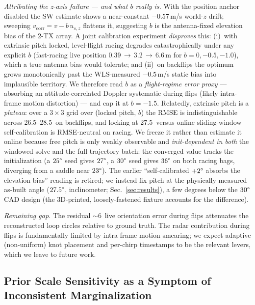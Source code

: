 \documentclass[conference]{IEEEtran}
\begin{document}
\emph{Attributing the z-axis failure --- and what $b$ really is.}
With the position anchor disabled the SW estimate shows a near-constant
$-0.57$\,m/s world-$z$ drift; sweeping
$v_{\mathrm{corr}} = v - b\,u_{s,z}$ flattens it, suggesting $b$ is the
antenna-fixed elevation bias of the 2-TX array.  A joint calibration
experiment \emph{disproves} this: (i)~with extrinsic pitch locked,
level-flight racing degrades catastrophically under any explicit $b$
(fast-racing live position 0.39\,$\to$\,3.2\,$\to$\,6.6\,m for
$b{=}0,-0.5,-1.0$), which a true antenna bias would tolerate; and
(ii)~on backflips the optimum grows monotonically past the WLS-measured
$-0.5$\,m/s static bias into implausible territory.  We therefore read
$b$ as a \emph{flight-regime error proxy} --- absorbing an
attitude-correlated Doppler systematic during flips (likely intra-frame
motion distortion) --- and cap it at $b{=}{-}1.5$.
Relatedly, extrinsic pitch is a \emph{plateau}: over a $3{\times}3$ grid
over (locked pitch, $b$) the RMSE is indistinguishable across
26.5--28.5\degree\ on backflips, and locking at 27.5\degree\ versus
online sliding-window self-calibration is RMSE-neutral on racing.  We
freeze it rather than estimate it online because free pitch is only
weakly observable and \emph{init-dependent in both} the windowed solve
and the full-trajectory batch: the converged value tracks the
initialization (a $25\degree$ seed gives $27\degree$, a $30\degree$ seed
gives $36\degree$ on both racing bags, diverging from a saddle near
$23\degree$).  The earlier ``self-calibrated $+2\degree$ absorbs the
elevation bias'' reading is retired; we instead fix pitch at the
physically measured as-built angle ($27.5\degree$, inclinometer;
Sec.~\ref{sec:results}), a few degrees below the $30\degree$ CAD design
(the 3D-printed, loosely-fastened fixture accounts for the difference).

\emph{Remaining gap.}
The residual $\sim$6\degree\ live orientation error during flips
attenuates the reconstructed loop circles relative to ground truth.
The radar contribution during flips is fundamentally limited by
intra-frame motion smearing; we expect adaptive (non-uniform) knot
placement and per-chirp timestamps to be the relevant levers, which
we leave to future work.


\subsection{Prior Scale Sensitivity as a Symptom of Inconsistent
Marginalization}
\label{sec:prior_scale}
\end{document}
